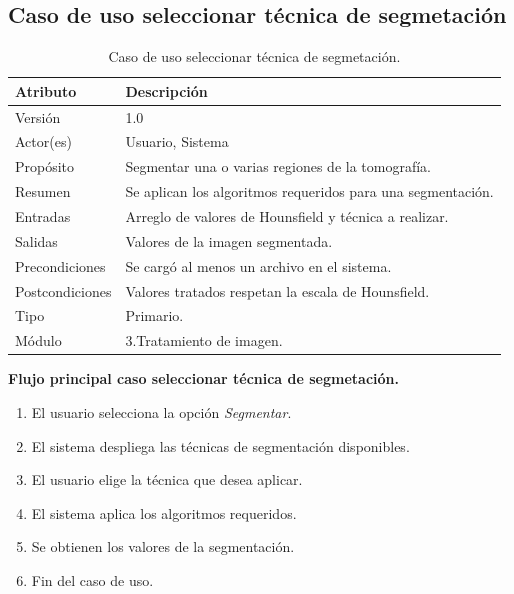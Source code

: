 \documentclass[12pt]{report}
\begin{document}
\subsection{Caso de uso seleccionar técnica de segmetación}
\begin{table}[H]
\begin{center}
\begin{tabular}{p{30mm}p{80mm}}
\hline
Atributo & Descripción\\
\hline \hline 
Versión & 1.0\\
Actor(es) & Usuario, Sistema\\
Propósito & Segmentar una o varias regiones de la tomografía.\\
Resumen & Se aplican los algoritmos requeridos para una segmentación.\\
Entradas & Arreglo de valores de Hounsfield y técnica a realizar.\\
Salidas & Valores de la imagen segmentada.\\
Precondiciones & Se cargó al menos un archivo en el sistema.\\
Postcondiciones & Valores tratados respetan la escala de Hounsfield.\\
Tipo & Primario.\\
Módulo & 3.Tratamiento de imagen.\\
\hline \hline
\end{tabular}
\caption{Caso de uso seleccionar técnica de segmetación.}
\end{center}
\end{table}

\textbf{Flujo principal caso seleccionar técnica de segmetación. }
\begin{enumerate}
\item El usuario selecciona la opción \textit{Segmentar}.
\item El sistema despliega las técnicas de segmentación disponibles.
\item El usuario elige la técnica que desea aplicar.
\item El sistema aplica los algoritmos requeridos.
\item Se obtienen los valores de la segmentación.
\item Fin del caso de uso.
\end{enumerate}
\end{document}
